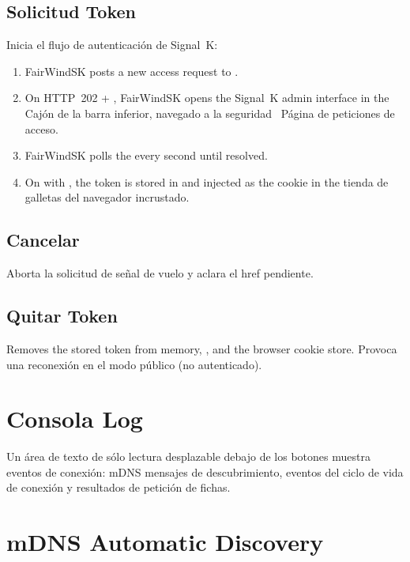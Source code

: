 \subsection{Solicitud Token}

Inicia el flujo de autenticación de Signal~K:

\begin{enumerate}
  \item FairWindSK posts a new access request to .
  \item On HTTP~202 + , FairWindSK opens the Signal~K admin interface in the
Cajón de la barra inferior, navegado a la seguridad~ Página de peticiones de acceso.
  \item FairWindSK polls the  every second until resolved.
  \item On  with , the token is stored in
         and injected as the  cookie in the
tienda de galletas del navegador incrustado.
\end{enumerate}

\subsection{Cancelar}

Aborta la solicitud de señal de vuelo y aclara el href pendiente.

\subsection{Quitar Token}

Removes the stored token from memory, , and the browser cookie store.
Provoca una reconexión en el modo público (no autenticado).

\section{Consola Log}

Un área de texto de sólo lectura desplazable debajo de los botones muestra eventos de conexión:
mDNS mensajes de descubrimiento, eventos del ciclo de vida de conexión y resultados de petición de fichas.

\section{mDNS Automatic Discovery}

